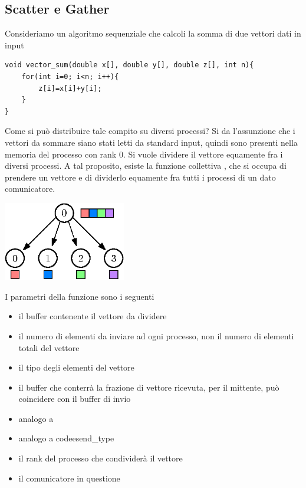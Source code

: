 \documentclass[10pt, letterpaper]{report}
\begin{document}
\subsection{Scatter e Gather}
Consideriamo un algoritmo sequenziale che calcoli la somma di due vettori dati in input 
\begin{lstlisting}[style=CStyle]
void vector_sum(double x[], double y[], double z[], int n){
    for(int i=0; i<n; i++){
        z[i]=x[i]+y[i];
    }
}
\end{lstlisting}
Come si può distribuire tale compito su diversi processi? Si da l'assunzione che i vettori da 
sommare siano stati letti da standard input, quindi sono presenti nella memoria del processo con 
rank 0. Si vuole dividere il vettore equamente fra i diversi processi.\acc 
A tal proposito, esiste la funzione collettiva , che si occupa di prendere un 
vettore e di dividerlo equamente fra tutti i processi di un dato comunicatore.\begin{center}
    \includegraphics[width=0.4\textwidth]{images/scatter.eps}
\end{center}
I parametri della funzione sono i seguenti\begin{itemize}
    \item {} il buffer contenente il vettore da dividere
    \item  {} il numero di elementi da inviare ad ogni processo, non il numero di elementi 
    totali del vettore
    \item  {} il tipo degli elementi del vettore 
    \item  {} il buffer che conterrà la frazione di vettore ricevuta, per il mittente, può 
    coincidere con il buffer di invio 
    \item  {} analogo a 
    \item  {} analogo a codee{send\_type}
    \item  {} il rank del processo che condividerà il vettore 
    \item {} il comunicatore in questione
\end{itemize}
\end{document}
